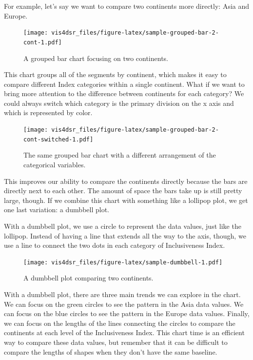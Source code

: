 \documentclass[
]{krantz}
\begin{document}
For example, let's say we want to compare two continents more directly: Asia and Europe.

\begin{figure}
\centering
\texttt{[image: vis4dsr\_files/figure-latex/sample-grouped-bar-2-cont-1.pdf]}
\caption{\label{fig:sample-grouped-bar-2-cont}A grouped bar chart focusing on two continents.}
\end{figure}

This chart groups all of the segments by continent, which makes it easy to compare
different Index categories within a single continent. What if we want to bring more
attention to the difference between continents for each category? We could always
switch which category is the primary division on the x axis and which is
represented by color.

\begin{figure}
\centering
\texttt{[image: vis4dsr\_files/figure-latex/sample-grouped-bar-2-cont-switched-1.pdf]}
\caption{\label{fig:sample-grouped-bar-2-cont-switched}The same grouped bar chart with a different arrangement of the categorical variables.}
\end{figure}

This improves our ability to compare the continents directly because the bars are
directly next to each other. The amount of space the bars take up is still pretty
large, though. If we combine this chart with something like a lollipop plot, we
get one last variation: a dumbbell plot.

With a dumbbell plot, we use a circle to represent the data values, just like the
lollipop. Instead of having a line that extends all the way to the axis, though,
we use a line to connect the two dots in each category of Inclusiveness Index.

\begin{figure}
\centering
\texttt{[image: vis4dsr\_files/figure-latex/sample-dumbbell-1.pdf]}
\caption{\label{fig:sample-dumbbell}A dumbbell plot comparing two continents.}
\end{figure}

With a dumbbell plot, there are three main trends we can explore in the chart. We
can focus on the green circles to see the pattern in the Asia data values. We can
focus on the blue circles to see the pattern in the Europe data values. Finally,
we can focus on the lengths of the lines connecting the circles to compare the
continents at each level of the Inclusiveness Index. This chart time is an efficient
way to compare these data values, but remember that it can be difficult to compare
the lengths of shapes when they don't have the same baseline.
\end{document}

